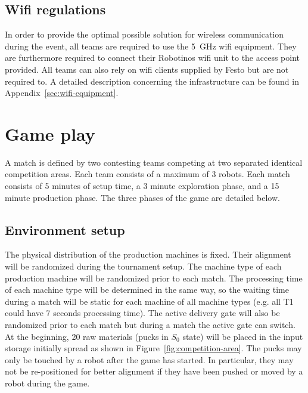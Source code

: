 \documentclass[12pt,twoside]{article}
\newcommand{\reffig}[1]{Figure~\ref{#1}}
\begin{document}
\subsection{Wifi regulations}
\label{sec:wifi-regulations}
In order to provide the optimal possible solution for wireless
communication during the event, all teams are required to use the
\SI{5}{\giga\hertz} wifi equipment. They are furthermore required to
connect their Robotinos wifi unit to the access point provided. All
teams can also rely on wifi clients supplied by Festo but are not
required to. A detailed description concerning the infrastructure can
be found in Appendix~\ref{sec:wifi-equipment}.



\section{Game play}
A match is defined by two contesting teams competing at two separated
identical competition areas. Each team consists of a maximum of 3
robots. Each match consists of 5 minutes of setup time,
a 3 minute exploration phase, and a 15 minute production phase.
The three phases of the game are detailed below.

\subsection{Environment setup}
\label{sec:env-setup}

The physical distribution of the production machines is fixed. Their
alignment will be randomized during the tournament setup. The machine
type of each production machine will be randomized prior to each
match. The processing time of each machine type will be determined in
the same way, so the waiting time during a match will be static for
each machine of all machine types (e.g. all T1 could have 7 seconds
processing time). The active delivery gate will also be randomized
prior to each match but during a match the active gate can switch.  At
the beginning, 20 raw materials (pucks in $S_0$ state) will be placed
in the input storage initially spread as shown in
\reffig{fig:competition-area}. The pucks may only be touched by a
robot after the game has started. In particular, they may not be
re-positioned for better alignment if they have been pushed or moved by
a robot during the game.
\end{document}
